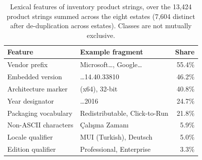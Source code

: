 \begin{table}[htbp]
\centering
\caption{Lexical features of inventory product strings, over the 13,424 product strings summed across the eight estates (7,604 distinct after de-duplication across estates). Classes are not mutually exclusive.}
\label{tab:lexical}
\footnotesize
\begin{tabular}{l l r}
\hline
Feature & Example fragment & Share \\
\hline
Vendor prefix & Microsoft\ldots, Google\ldots & 55.4\% \\
Embedded version & \ldots 14.40.33810 & 46.2\% \\
Architecture marker & (x64), 32-bit & 40.8\% \\
Year designator & \ldots 2016 & 24.7\% \\
Packaging vocabulary & Redistributable, Click-to-Run & 21.8\% \\
Non-ASCII characters & Çalışma Zamanı & 5.9\% \\
Locale qualifier & MUI (Turkish), Deutsch & 5.0\% \\
Edition qualifier & Professional, Enterprise & 3.3\% \\
\hline
\end{tabular}
\end{table}
